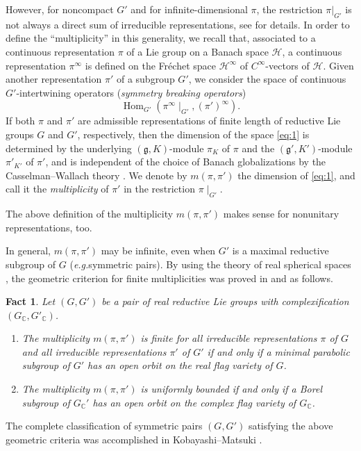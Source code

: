 \documentclass[reqno,12pt]{pja00} %
\providecommand{\C}{\mathbb{C}}
\theoremstyle{plain}
\newtheorem{fact}[theorem]{Fact}
\theoremstyle{definition}
\theoremstyle{exampstyle} \newtheorem{examp}[theorem]{Theorem}
\newcommand{\Hom}{\operatorname{Hom}}
\begin{document}
However, 
for noncompact $G'$ and for infinite-dimensional $\pi$,
the restriction $\pi|_{G'}$
is not always a direct sum of irreducible representations, see \cite{kobayashi1998discrete2,
kobayashi1998discrete3} for details.
In order to define the ``multiplicity'' in this generality, we recall that, associated to a continuous representation $\pi$ of a Lie group on a Banach space $\mathcal{H}$, 
a continuous representation $\pi^\infty$ is defined on the Fr\'echet space $\mathcal{H}^\infty$ of $C^\infty$-vectors of $\mathcal{H}$.
Given another representation $\pi'$ of a subgroup $G'$, we consider the space of continuous $G'$-intertwining operators ({\it symmetry breaking operators})
\begin{equation}\label{eq:1}
	\Hom_{G'}\left( \pi^\infty\!\mid_{G'}, \left( \pi' \right)^\infty\right).\tag{1.1}
\end{equation}
If both $\pi$ and $\pi'$ are admissible representations of finite 
length of reductive Lie groups $G$ and $G'$, respectively, then the dimension of the space \eqref{eq:1} is determined by the underlying
$(\mathfrak{g},K)$-module $\pi_K$ of $\pi$ and the $(\mathfrak{g}',K')$-module $\pi'_{K'}$ of $\pi'$, and is independent of the choice of Banach globalizations by the 
Casselman--Wallach theory
\cite[Chap.\ 11]{wallach1988real2}. We denote by $m(\pi,\pi')$ the dimension of \eqref{eq:1}, and call it the {\it multiplicity} of $\pi'$ in the restriction $\pi\!\mid_{G'}$.

The above definition of the multiplicity $m(\pi,\pi')$ makes sense 
for nonunitary representations, too. 

In general, $m(\pi,\pi')$ may be infinite, even when $G'$ is a 
maximal reductive subgroup of $G$
({\it e.g.}\;symmetric pairs). %
By using the theory of real spherical spaces \cite{kobayashi2013finite}, 
the geometric criterion for finite multiplicities was proved in \cite{Kobayashi2014} and \cite{kobayashi2013finite}
as follows.

\begin{fact}\label{fact:1} Let $(G,G')$ be a pair of real reductive Lie groups with complexification $(G_{\C},G'_{\C})$.
	\begin{enumerate}[(1)]
		\item The multiplicity $m(\pi,\pi')$ is finite for all irreducible representations $\pi$ of $G$ and all irreducible representations $\pi'$ of $G'$ if and only if
			a minimal parabolic subgroup of $G'$ has an open orbit on the real flag variety of $G$.
		\item The multiplicity $m(\pi,\pi')$ is uniformly bounded if and only if a Borel subgroup of $G_{\C}'$ has an open orbit on the complex flag variety of $G_{\C}$.
	\end{enumerate}
\end{fact}
The complete classification of symmetric pairs $(G, G')$ satisfying the above geometric criteria
was accomplished in Kobayashi--Matsuki \cite{kobayashi2014classification}.
\end{document}
